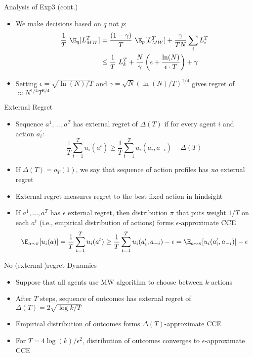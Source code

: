 \documentclass[11pt,aspectratio=169,handout]{beamer}
\begin{document}
  \begin{frame}{Analysis of Exp3 (cont.)}
  \begin{itemize}[<+->]
   \item We make decisions based on $q$ not $p$:
   \begin{align*}
    \frac{1}{T}~\E_{q}[L_{MW}^T] &= \frac{(1-\gamma)}{T}~\E_{p}[L_{MW}^T] + \frac{\gamma}{TN}\sum_i L_i^T\\
    &\le \frac{1}{T}~L_k^T + \frac{N}{\gamma}\left(\epsilon + \frac{\ln(N)}{\epsilon\cdot T}\right) + \gamma
   \end{align*}
   \item Setting $\epsilon = \sqrt{\ln(N)/T}$ and $\gamma = \sqrt{N}\left(\ln(N)/T\right)^{1/4}$ gives regret of $\approx N^{1/4}T^{3/4}$
  \end{itemize}
 \end{frame}
  
  \begin{frame}{External Regret}
   \begin{itemize}[<+->]
    \item Sequence $a^1,\dots,a^T$ has \alert{external regret} of $\Delta(T)$ if for every agent $i$ and action $a_i^\prime$:
    \[\frac{1}{T}\sum_{t=1}^T u_i(a^t) \geq \frac{1}{T} \sum_{t=1}^T u_i(a_i^\prime,a_{-i}) - \Delta(T)\]
    \item If $\Delta(T) = o_T(1)$, we say that sequence of action profiles has \emph{no} external regret
    \item External regret measures regret to the best \alert{fixed} action in hindsight
    \item If $a^1,\dots,a^T$ has $\epsilon$ external regret, then distribution $\pi$ that puts weight $1/T$ on each $a^t$ (i.e., empirical distribution of actions) forms \alert{$\epsilon$-approximate CCE}
    \[\E_{a\sim \pi}[u_i(a)] = \frac{1}{T}\sum_{t=1}^T u_i(a^t) \ge \frac{1}{T}\sum_{t=1}^T u_i(a_i^\prime,a_{-i}) - \epsilon = \E_{a\sim \pi}[u_i(a_i^\prime, a_{-i})] - \epsilon\]
   \end{itemize}
  \end{frame}
  
  
  \begin{frame}{No-(external-)regret Dynamics}
   \begin{itemize}[<+->]
   \setlength{\itemsep}{1.5em}
    \item Suppose that all agents use MW algorithm to choose between $k$ actions
    \item After $T$ steps, sequence of outcomes has external regret of $\Delta(T) = 2\sqrt{\log k/T}$
    \item Empirical distribution of outcomes forms $\Delta(T)$-approximate CCE
    \item For $T = 4\log(k)/\epsilon^2$, distribution of outcomes converges to $\epsilon$-approximate CCE
   \end{itemize}
  \end{frame}
  
\end{document}
